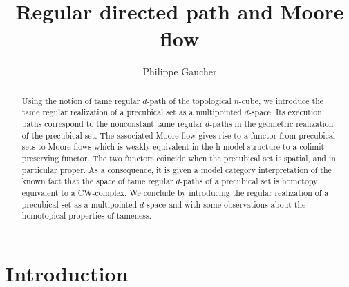 \documentclass[a4paper,12pt]{amsart}
\title{Regular directed path and Moore flow}
\author[P. Gaucher]{Philippe Gaucher}
\theoremstyle{definition}
\begin{document}
	
	
\begin{abstract}
	Using the notion of tame regular $d$-path of the topological $n$-cube, we introduce the tame regular realization of a precubical set as a multipointed $d$-space. Its execution paths correspond to the nonconstant tame regular $d$-paths in the geometric realization of the precubical set. The associated Moore flow gives rise to a functor from precubical sets to Moore flows which is weakly equivalent in the h-model structure to a colimit-preserving functor. The two functors coincide when the precubical set is spatial, and in particular proper. As a consequence, it is given a model category interpretation of the known fact that the space of tame regular $d$-paths of a precubical set is homotopy equivalent to a CW-complex. We conclude by introducing the regular realization of a precubical set as a multipointed $d$-space and with some observations about the homotopical properties of tameness.
\end{abstract}
	
\maketitle
\tableofcontents
\hypersetup{linkcolor = dark-red}


\section{Introduction}
\end{document}
